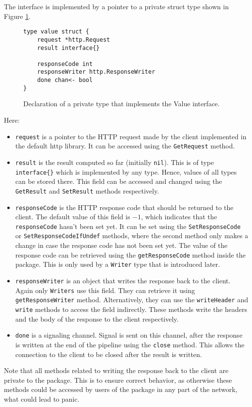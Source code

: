 The interface is implemented by a pointer to a private struct type shown in 
Figure \ref{fig:value}.
\newpage
\begin{figure}[h]
\centering
\begin{lstlisting}
type value struct {
    request *http.Request
    result interface{}

    responseCode int
    responseWriter http.ResponseWriter
    done chan<- bool
}
\end{lstlisting}
\caption[scale=1.0]{Declaration of a private type that implements the Value 
interface.}
\label{fig:value}
\end{figure}
Here:
\begin{itemize}
  \item \texttt{request} is a pointer to the HTTP request made by the 
        client implemented in the default http library. It can be accessed
        using the \texttt{GetRequest} method. 

  \item \texttt{result} is the result computed so far (initially \texttt{nil}). This is
        of type \texttt{interface\{\}} which is implemented by any type.
        Hence, values of all types can be stored there. This field can be
        accessed and changed using the \texttt{GetResult} and \texttt{SetResult}
        methods respectively.
  
  \item \texttt{responseCode} is the HTTP response code that should be 
        returned to the client. The default value of this field is $-1$,
        which indicates that the \texttt{responseCode} hasn't been set yet. 
        It can be set using the \texttt{SetResponseCode} or 
        \texttt{SetResponseCodeIfUndef} methods, where the second method only
        makes a change in case the response code has not been set yet. The value
        of the response code can be retrieved using the \texttt{getResponseCode}
        method inside the package. This is only used by a 
        \texttt{Writer} type that is introduced later.

  \item \texttt{responseWriter} is an object that writes the response back 
        to the client. Again only \texttt{Writers} use this field. They
        can retrieve it using \texttt{getResponseWriter} method. 
        Alternatively, they can use the \texttt{write\-Header}
        and \texttt{write} methods to access the field indirectly.
        These methods write the headers and 
        the body of the response to the client respectively.

  \item \texttt{done} is a signaling channel. Signal is sent on this channel,
		after the response is written at the end of the pipeline using the 
        \texttt{close} method. This allows the connection to the client to 
        be closed after the result is written.
\end{itemize}
Note that all methods related to writing the response back to the client
are private to the package. This is to ensure correct behavior, as otherwise
these methods could be accessed by users of the package in any part of the 
network, what could lead to panic.

